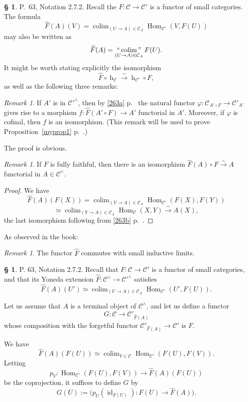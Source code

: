 \documentclass[12pt]{article}%
\theoremstyle{remark}
\newtheorem{rk}[thm]{Remark}
\theoremstyle{definition}
\newtheorem{s}[thm]{\S}%
\newcommand{\cc}{\mathcal}
\newcommand{\C}{\mathcal C}
\newcommand{\xr}{\xrightarrow}
\DeclareMathOperator*{\colim}{colim}
\DeclareMathOperator*{\col}{colim}
\DeclareMathOperator*{\icolim}{``\colim"}
\DeclareMathOperator{\hy}{h}
\DeclareMathOperator{\id}{id}
\DeclareMathOperator{\Hom}{Hom}%
\begin{document}
\begin{s} 
P.~63, Notation 2.7.2. Recall the $F:\C\to\C'$ is a functor of small categories. The formula 
$$
\widehat F(A)(V)=\colim_{(U\to A)\in\C_A}\Hom_{\C'}(V,F(U))
$$
may also be written as 
$$
\widehat F(A)=\icolim_{(U\to A)\in\C_A}F(U).
$$
It might be worth stating explicitly the isomorphism 
$$
\widehat F\circ\hy_\C\xr\sim\hy_{\C'}\circ F,
$$
as well as the following three remarks:

\begin{rk}\label{cof}
If $A'$ is in $\cc C'^\wedge$, then by \eqref{263a} p.~\pageref{263a} the natural functor $\varphi:\cc C_{A'\circ F}\to\cc C'_{A'}$ gives rise to a morphism $f:\widehat F(A'\circ F)\to A'$ functorial in $A'$. Moreover, if $\varphi$ is cofinal, then $f$ is an isomorphism. (This remark will be used to prove Proposition~\ref{myprop1} p.~\pageref{myprop1}.)
\end{rk}

The proof is obvious.

\begin{rk}
If $F$ is fully faithful, then there is an isomorphism $\widehat F(A)\circ F\xr\sim A$ functorial in $A\in\C^\wedge$.
\end{rk} 

\begin{proof}
We have 
$$
\widehat F(A)(F(X))=\colim_{(Y\to A)\in\C_A}\Hom_{\C'}(F(X),F(Y))
$$
$$
\simeq\colim_{(Y\to A)\in\C_A}\Hom_\C(X,Y)\xr\sim A(X),
$$
the last isomorphism following from \eqref{263b} p.~\pageref{263b}.
\end{proof}

As observed in the book:

\begin{rk}\label{272}
The functor $\widehat F$ commutes with small inductive limits.
\end{rk}
\end{s}

%

\begin{s}\label{272b}
P. 63, Notation 2.7.2. Recall that $F:\C\to\C'$ is a functor of small categories, and that its Yoneda extension $\widehat F:\C^\wedge\to\C'^\wedge$ satisfies 
$$
\widehat F(A)(U')\simeq\col_{(U\to A)\in\C_A}\Hom_{\C'}(U',F(U)).
$$ 

Let us assume that $A$ is a terminal object of $\C^\wedge$, and let us define a functor 
$$
G:\C\to\C'_{\widehat F(A)}
$$ 
whose composition with the forgetful functor $\C'_{\widehat F(A)}\to\C'$ is $F$.

We have 
$$
\widehat F(A)(F(U))\simeq\col_{V\in\C}\Hom_{\C'}(F(U),F(V)).
$$ 
Letting 
$$
p_V:\Hom_{\C'}(F(U),F(V))\to\widehat F(A)(F(U))
$$ 
be the coprojection, it suffices to define $G$ by
$$
G(U):=\big(p_U(\id_{F(U)}):F(U)\to\widehat F(A)\big).
$$
\end{s}
\end{document}
